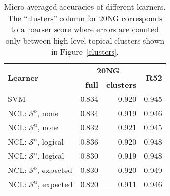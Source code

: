 \documentclass{article} %
\newcommand{\unorderedS}{\mathcal{S}^{\mathrm{u}}}
\newcommand{\orderedS}{\mathcal{S}^{\mathrm{o}}}
\newcommand{\ourmethod}{NCL}
\begin{document}
\begin{table}[t]
\caption{Micro-averaged accuracies of different
  learners.  The ``clusters'' column for 20NG corresponds to a coarser
score where errors are counted only between high-level topical
clusters shown in Figure~\ref{clusters}.}
\label{accuraciesTable}
\begin{center}
\begin{tabular}{l|rr|r}
\multirow{2}{*}{\bf Learner}          &  \multicolumn{2}{c|}{\bf 20NG} & \multirow{2}{*}{\bf{R52}} \\
                                      & \bf{full} & \bf{clusters}      & 
\\ \hline 
SVM                                   & 0.834     & 0.920              & 0.945 \\
\ourmethod{}: $\orderedS$, none       & 0.834     & 0.919              & 0.946 \\ 
\ourmethod{}: $\unorderedS$, none     & 0.832     & 0.921              & 0.945 \\
\ourmethod{}: $\orderedS$, logical    & 0.836     & 0.920              & 0.948 \\ 
\ourmethod{}: $\unorderedS$, logical  & 0.830     & 0.919              & 0.948 \\
\ourmethod{}: $\orderedS$, expected   & 0.830     & 0.920              & 0.949 \\ 
\ourmethod{}: $\unorderedS$, expected & 0.820     & 0.911              & 0.946 \\
\end{tabular}
\end{center}
\end{table}

 
\end{document}
